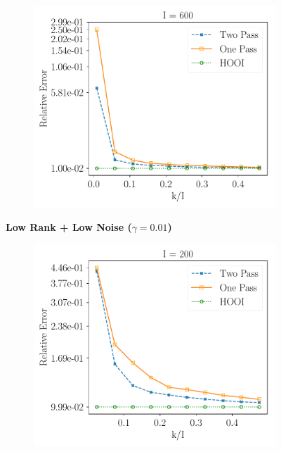 \begin{figure}[H]
\begin{subfigure}{0.32\textwidth}
    \includegraphics[scale = 0.3]{figure/lk_lnoise_n600.pdf}
    \end{subfigure}
\textbf{Low Rank + Low Noise ($\gamma = 0.01$)} \\ 
\centering
    \begin{subfigure}{0.32\textwidth}
    \includegraphics[scale = 0.3]{figure/lk_mnoise_n200.pdf}
    \end{subfigure}
    \begin{subfigure}{0.32\textwidth}

\end{subfigure}
\end{figure}
